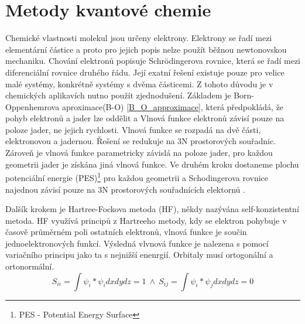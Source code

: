 \documentclass[
  digital, %
  table,   %
  lof,     %
  lot,     %
]{fithesis3}
\begin{document}
\section{Metody kvantové chemie}
Chemické vlastnosti molekul jsou určeny elektrony. Elektrony se řadí mezi elementární částice a proto pro jejich popis nelze použít běžnou newtonovskou mechaniku. Chování elektronů popisuje Schrödingerova rovnice, která se řadí mezi diferenciální rovnice druhého řádu. Její exatní řešení existuje pouze pro velice malé systémy, konkrétně systémy s dvěma částicemi. Z tohoto důvodu je v chemických aplikavích nutno použít zjednodušení. Základem je Born-Oppenhemrova aproximace(B-O) \ref{B_O_approximace}, která předpokládá, že pohyb elektronů a jader lze oddělit a Vlnová funkce elektronů závisí pouze na poloze jader, ne jejich rychlosti. Vlnová funkce se rozpadá na dvě části, elektronovou a jadernou. Řešení se redukuje na 3N prostorových souřadnic. Zároveň je vlnová funkce parametricky závislá na poloze jader, pro každou geometrii jader je získána jiná vlnová funkce. Ve druhém kroku dostaneme plochu potenciální energie (PES)\footnote{PES - Potential Energy Surface} pro každou geometrii a Schodingerova rovnice najednou závisí pouze na 3N prostorových souřadnících elektornů \cite{lechamolecularmodeling}.

 Dalšík krokem je Hartree-Fockova metoda (HF), někdy nazývána self-konzistentní metoda. HF využívá principů z Hartreeho metody, kdy se elektron pohybuje v časově průměrném poli ostatních elektronů, vlnová funkce je součin jednoelektronových funkcí. Výsledná vlvnová funkce je nalezena s pomocí variačního principu jako ta s nejnižší enenrgií. Orbitaly musí ortogonální a ortonormální.
 \begin{equation}
 S_{ii} = \int \psi_i * \psi_i dx dy dz = 1 ~ \wedge ~ S_{ij} = \int \psi_i * \psi_j dx dy dz = 0
 \end{equation}
\end{document}
